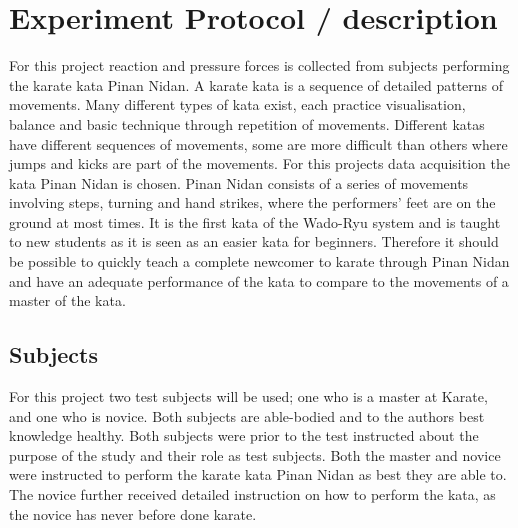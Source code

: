 \section{Experiment Protocol / description} %
For this project reaction and pressure forces is collected from subjects performing the karate kata Pinan Nidan. %
A karate kata is a sequence of detailed patterns of movements. Many different types of kata exist, each practice visualisation, balance and basic technique through repetition of movements. Different katas have different sequences of movements, some are more difficult than others where jumps and kicks are part of the movements. For this projects data acquisition the kata Pinan Nidan is chosen. Pinan Nidan consists of a series of movements involving steps, turning and hand strikes, where the performers' feet are on the ground at most times. It is the first kata of the Wado-Ryu system and is taught to new students as it is seen as an easier kata for beginners. \cite{Mccarthy1987, Dojo2018} Therefore it should be possible to quickly teach a complete newcomer to karate through Pinan Nidan and have an adequate performance of the kata to compare to the movements of a master of the kata. 

\subsection{Subjects} %
For this project two test subjects will be used; one who is a master at Karate, and one who is novice. Both subjects are able-bodied and to the authors best knowledge healthy. Both subjects were prior to the test instructed about the purpose of the study and their role as test subjects. Both the master and novice were instructed to perform the karate kata Pinan Nidan as best they are able to. The novice further received detailed instruction on how to perform the kata, as the novice has never before done karate. 






